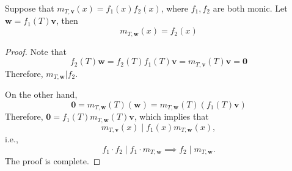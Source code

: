 \begin{proposition}
Suppose that $m_{T,\bm v}(x)= f_1(x)f_2(x)$, where $f_1,f_2$ are both monic. Let $\bm w = f_1(T)\bm v$, then
\[
m_{T,\bm w}(x) = f_2(x)
\]
\end{proposition}
\begin{proof}
Note that 
\[
f_2(T)\bm w = f_2(T)f_1(T)\bm v = m_{T,\bm v}(T)\bm v=\bm0
\]
Therefore, $m_{T,\bm w}|f_2$.

On the other hand,
\[
\bm0 = m_{T,\bm w}(T)(\bm w) = m_{T,\bm w}(T)(f_1(T)\bm v)
\]
Therefore, $\bm0 = f_1(T)m_{T,\bm w}(T)\bm v$, which implies that
\[
m_{T,\bm v}(x)\mid f_1(x)m_{T,\bm w}(x),
\]
i.e.,
\[
f_1\cdot f_2\mid f_1\cdot m_{T,\bm w}\implies
f_2\mid m_{T,\bm w}.
\]
The proof is complete.
\end{proof}















